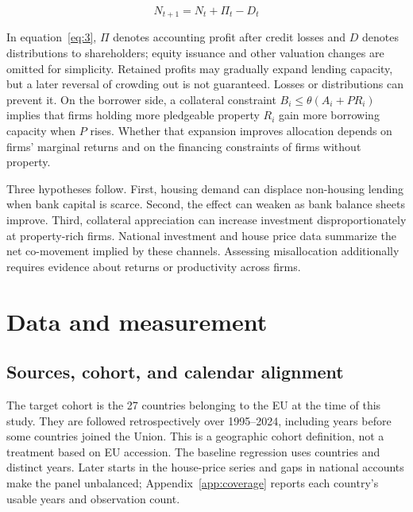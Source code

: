 \documentclass[11pt,letterpaper]{article}
\begin{document}
\begin{equation}\label{eq:3}
N_{t+1}=N_t+\Pi_t-D_t
\end{equation}

In equation~\eqref{eq:3}, $\Pi$ denotes accounting profit after credit losses and $D$ denotes distributions to shareholders; equity issuance and other valuation changes are omitted for simplicity. Retained profits may gradually expand lending capacity, but a later reversal of crowding out is not guaranteed. Losses or distributions can prevent it. On the borrower side, a collateral constraint $B_i\leq\theta(A_i+P R_i)$ implies that firms holding more pledgeable property $R_i$ gain more borrowing capacity when $P$ rises. Whether that expansion improves allocation depends on firms' marginal returns and on the financing constraints of firms without property.


Three hypotheses follow. First, housing demand can displace non-housing lending when bank capital is scarce. Second, the effect can weaken as bank balance sheets improve. Third, collateral appreciation can increase investment disproportionately at property-rich firms. National investment and house price data summarize the net co-movement implied by these channels. Assessing misallocation additionally requires evidence about returns or productivity across firms.



\section{Data and measurement}
\subsection{Sources, cohort, and calendar alignment}
The target cohort is the 27 countries belonging to the EU at the time of this study. They are followed retrospectively over 1995--2024, including years before some countries joined the Union. This is a geographic cohort definition, not a treatment based on EU accession. The baseline regression uses \PanelCountries{} countries and \PanelYears{} distinct years. Later starts in the house-price series and gaps in national accounts make the panel unbalanced; Appendix~\ref{app:coverage} reports each country's usable years and observation count.
\end{document}
